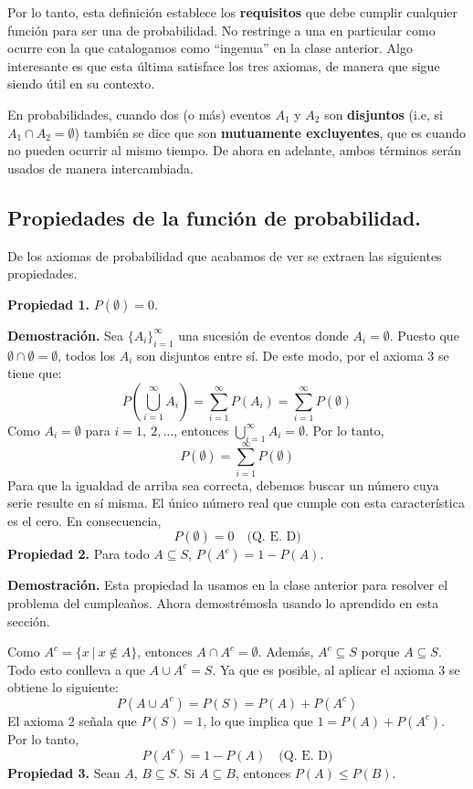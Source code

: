 \documentclass[12pt]{article}
\begin{document}
Por lo tanto, esta definición establece los \textbf{requisitos} que debe cumplir cualquier función para ser una de probabilidad. No restringe a una en particular como ocurre con la que catalogamos como ``ingenua'' en la clase anterior. Algo interesante es que esta última satisface los tres axiomas, de manera que sigue siendo útil en su contexto.

En probabilidades, cuando dos (o más) eventos $A_{1}$ y $A_{2}$ son \textbf{disjuntos} (i.e, si $A_{1} \cap A_{2} = \emptyset$) también se dice que son \textbf{mutuamente excluyentes}, que es cuando no pueden ocurrir al mismo tiempo. De ahora en adelante, ambos términos serán usados de manera intercambiada.

\subsection{Propiedades de la función de probabilidad.}

De los axiomas de probabilidad que acabamos de ver se extraen las siguientes propiedades.

\textbf{Propiedad 1.} $P(\emptyset) = 0$.

\textbf{Demostración.} Sea $\{A_{i}\}_{i = 1}^{\infty}$ una sucesión de eventos donde $A_{i} = \emptyset$. Puesto que $\emptyset \cap \emptyset = \emptyset$, todos los $A_{i}$ son disjuntos entre sí. De este modo, por el axioma 3 se tiene que:
\[
  P\left(\bigcup_{i = 1}^{\infty} A_{i}\right) = \sum_{i = 1}^{\infty} P(A_{i})
                                               = \sum_{i = 1}^{\infty} P(\emptyset)
\]
Como $A_{i} = \emptyset$ para $i = 1, \ 2, \ldots$, entonces $\bigcup_{i = 1}^{\infty}A_{i} = \emptyset$. Por lo tanto,
\[
  P(\emptyset) = \sum_{i = 1}^{\infty} P(\emptyset)
\]
Para que la igualdad de arriba sea correcta, debemos buscar un número cuya serie resulte en sí misma. El único número real que cumple con esta característica es el cero. En consecuencia,
\[
  P(\emptyset) = 0 \quad \text{(Q. E. D)}
\]
\textbf{Propiedad 2.} Para todo $A \subseteq S$, $P(A^{c}) = 1 - P(A)$.

\textbf{Demostración.} Esta propiedad la usamos en la clase anterior para resolver el problema del cumpleaños. Ahora demostrémosla usando lo aprendido en esta sección.

Como $A^{c} = \{x \ | \ x \notin A\}$, entonces $A \cap A^{c} = \emptyset$. Además, $A^{c} \subseteq S$ porque $A \subseteq S$. Todo esto conlleva a que $A \cup A^{c} = S$. Ya que es posible, al aplicar el axioma 3 se obtiene lo siguiente:
\[
  P(A \cup A^{c}) = P(S) = P(A) + P(A^{c})
\]
El axioma 2 señala que $P(S) = 1$, lo que implica que $1 = P(A) + P(A^{c})$. Por lo tanto,
\[
  P(A^{c}) = 1 - P(A) \quad \text{(Q. E. D)}
\]
\textbf{Propiedad 3.} Sean $A$, $B \subseteq S$. Si $A \subseteq B$, entonces $P(A) \leq P(B)$.
\end{document}
